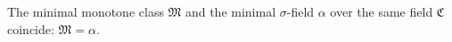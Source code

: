 The minimal monotone class $\mathfrak{M}$ and the minimal $\sigma$-field $\alpha$ over the same field $\mathfrak{C}$ coincide: $\mathfrak{M} = \alpha$.
